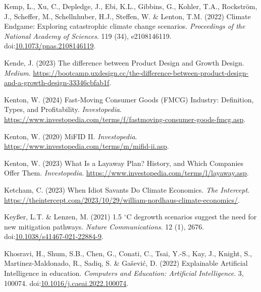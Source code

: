 \documentclass[
  letterpaper,
  DIV=11,
  numbers=noendperiod]{scrartcl}
\newlength{\cslhangindent}
\newenvironment{CSLReferences}[2] %
 {\begin{list}{}{%
  \setlength{\itemindent}{0pt}
  \setlength{\leftmargin}{0pt}
  \setlength{\parsep}{0pt}
  \ifodd #1
   \setlength{\leftmargin}{\cslhangindent}
   \setlength{\itemindent}{-1\cslhangindent}
  \fi
  \setlength{\itemsep}{#2\baselineskip}}}
 {\end{list}}
\begin{document}
\begin{CSLReferences}{0}{1}
Kemp, L., Xu, C., Depledge, J., Ebi, K.L., Gibbins, G., Kohler, T.A.,
Rockström, J., Scheffer, M., Schellnhuber, H.J., Steffen, W. \& Lenton,
T.M. (2022) Climate {Endgame}: {Exploring} catastrophic climate change
scenarios. \emph{Proceedings of the National Academy of Sciences}. 119
(34), e2108146119.
doi:\href{https://doi.org/10.1073/pnas.2108146119}{10.1073/pnas.2108146119}.

Kende, J. (2023) The difference between {Product Design} and {Growth
Design}. \emph{Medium}.
\url{https://bootcamp.uxdesign.cc/the-difference-between-product-design-and-a-growth-design-33346cbfab1f}.

Kenton, W. (2024) Fast-{Moving Consumer Goods} ({FMCG}) {Industry}:
{Definition}, {Types}, and {Profitability}. \emph{Investopedia}.
\url{https://www.investopedia.com/terms/f/fastmoving-consumer-goods-fmcg.asp}.

Kenton, W. (2020) {MiFID II}. \emph{Investopedia}.
\url{https://www.investopedia.com/terms/m/mifid-ii.asp}.

Kenton, W. (2023) What {Is} a {Layaway Plan}? {History}, and {Which
Companies Offer Them}. \emph{Investopedia}.
\url{https://www.investopedia.com/terms/l/layaway.asp}.

Ketcham, C. (2023) When {Idiot Savants Do Climate Economics}. \emph{The
Intercept}.
\url{https://theintercept.com/2023/10/29/william-nordhaus-climate-economics/}.

Keyßer, L.T. \& Lenzen, M. (2021) 1.5 {\(^\circ\)}{C} degrowth scenarios
suggest the need for new mitigation pathways. \emph{Nature
Communications}. 12 (1), 2676.
doi:\href{https://doi.org/10.1038/s41467-021-22884-9}{10.1038/s41467-021-22884-9}.

Khosravi, H., Shum, S.B., Chen, G., Conati, C., Tsai, Y.-S., Kay, J.,
Knight, S., Martinez-Maldonado, R., Sadiq, S. \& Gašević, D. (2022)
Explainable {Artificial Intelligence} in education. \emph{Computers and
Education: Artificial Intelligence}. 3, 100074.
doi:\href{https://doi.org/10.1016/j.caeai.2022.100074}{10.1016/j.caeai.2022.100074}.


\end{CSLReferences}
\end{document}
